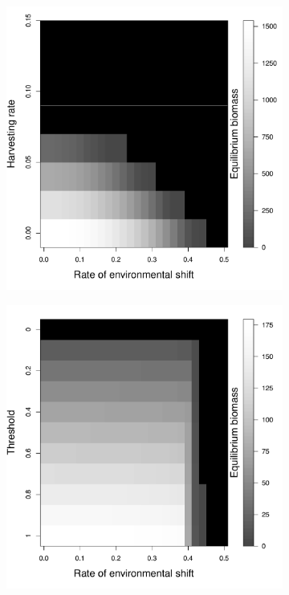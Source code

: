 \documentclass[12pt,english]{article}
\begin{document}
\begin{spacing}{1.9}
\begin{flushleft}
\begin{figure}[htbp]
\begin{subfigure}{.33\textwidth}
\subcaption{}
\includegraphics[width=\textwidth]{plots/eqbiomass_sim.pdf}
\end{subfigure}
\begin{subfigure}{.33\textwidth}
\subcaption{}
\includegraphics[width=\textwidth]{plots/eqbiomass_thresh.pdf}

\end{subfigure}
\end{figure}
\end{flushleft}
\end{spacing}
\end{document}
